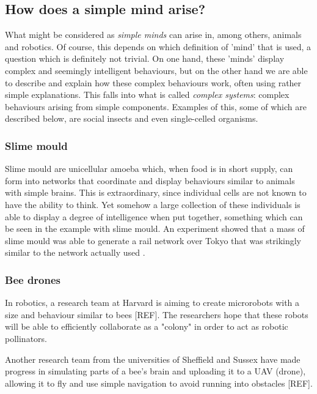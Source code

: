 \documentclass[11pt]{article}
\newenvironment{draft}{\color{dark-cornflower-blue-2}}{\ignorespacesafterend}
\begin{document}
\subsection{How does a simple mind arise?}
\begin{draft}

What might be considered as \textit{simple minds} can arise in, among others, animals and robotics. Of course, this depends on which definition of 'mind' that is used, a question which is definitely not trivial. On one hand, these 'minds' display complex and seemingly intelligent behaviours, but on the other hand we are able to describe and explain how these complex behaviours work, often using rather simple explanations. This falls into what is called \textit{complex systems}: complex behaviours arising from simple components. Examples of this, some of which are described below, are social insects and even single-celled organisms.

\subsubsection*{Slime mould}

Slime mould are unicellular amoeba which, when food is in short supply, can form into networks that coordinate and display behaviours similar to animals with simple brains. This is extraordinary, since individual cells are not known to have the ability to think. Yet somehow a large collection of these individuals is able to display a degree of intelligence when put together, something which can be seen in the example with slime mould. An experiment showed that a mass of slime mould was able to generate a rail network over Tokyo that was strikingly similar to the network actually used \cite{tero2010rules}. 

\subsubsection*{Bee drones}

In robotics, a research team at Harvard is aiming to create microrobots with a size and behaviour similar to bees [REF]. The researchers hope that these robots will be able to efficiently collaborate as a "colony" in order to act as robotic pollinators.

Another research team from the universities of Sheffield and Sussex have made progress in simulating parts of a bee's brain and uploading it to a UAV (drone), allowing it to fly and use simple navigation to avoid running into obstacles [REF].

\end{draft}
\end{document}

